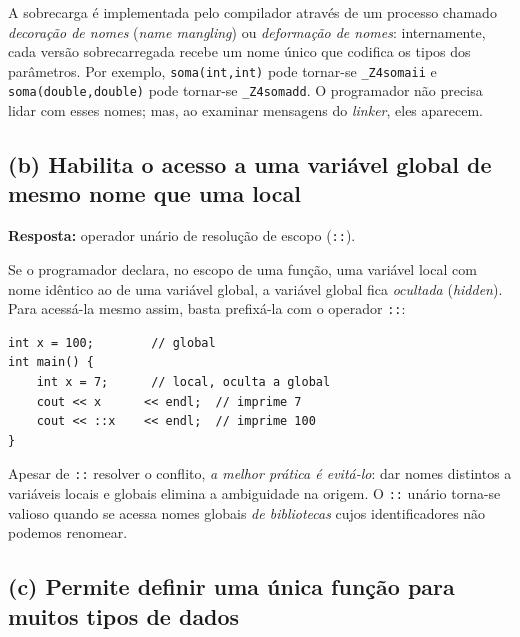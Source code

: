 \documentclass[11pt,a4paper]{article}
\begin{document}
\begin{obseng}
A sobrecarga \'e implementada pelo compilador atrav\'es de um processo chamado \emph{decora\c{c}\~ao de nomes} (\emph{name mangling}) ou \emph{deforma\c{c}\~ao de nomes}: internamente, cada vers\~ao sobrecarregada recebe um nome \'unico que codifica os tipos dos par\^ametros. Por exemplo, \texttt{soma(int,int)} pode tornar-se \texttt{\_Z4somaii} e \texttt{soma(double,double)} pode tornar-se \texttt{\_Z4somadd}. O programador n\~ao precisa lidar com esses nomes; mas, ao examinar mensagens do \emph{linker}, eles aparecem.
\end{obseng}

\subsection*{(b) Habilita o acesso a uma vari\'avel global de mesmo nome que uma local}

\begin{resposta}\textbf{Resposta:} operador un\'ario de resolu\c{c}\~ao de escopo (\texttt{::}).\end{resposta}

Se o programador declara, no escopo de uma fun\c{c}\~ao, uma vari\'avel local com nome id\^entico ao de uma vari\'avel global, a vari\'avel global fica \emph{ocultada} (\emph{hidden}). Para acess\'a-la mesmo assim, basta prefix\'a-la com o operador \texttt{::}:

\begin{lstlisting}[style=cppcode,numbers=none]
int x = 100;        // global
int main() {
    int x = 7;      // local, oculta a global
    cout << x      << endl;  // imprime 7
    cout << ::x    << endl;  // imprime 100
}
\end{lstlisting}

\begin{boaprat}
Apesar de \texttt{::} resolver o conflito, \emph{a melhor prática \'e evit\'a-lo}: dar nomes distintos a vari\'aveis locais e globais elimina a ambiguidade na origem. O \texttt{::} un\'ario torna-se valioso quando se acessa nomes globais \emph{de bibliotecas} cujos identificadores n\~ao podemos renomear.
\end{boaprat}

\subsection*{(c) Permite definir uma \'unica fun\c{c}\~ao para muitos tipos de dados}
\end{document}
